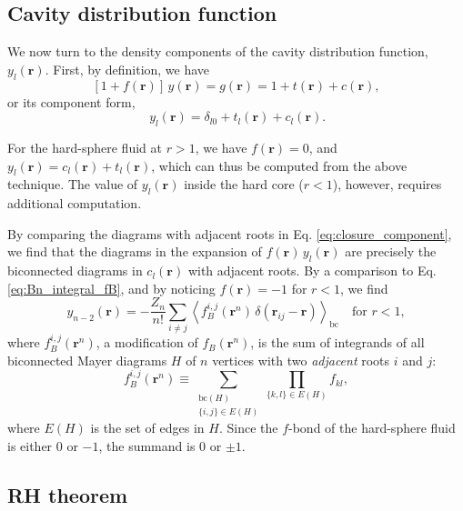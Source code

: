 \documentclass[aip,jcp,preprint,superscriptaddress,showpacs,preprintnumbers,amsmath,amssymb]{revtex4-1}
\numberwithin{equation}{section}
\newcommand{\vct}[1]{\mathbf{#1}}
\providecommand{\vr}{} %
\renewcommand{\vr}{\vct{r}}
\begin{document}
\subsection{Cavity distribution function}





We now turn to the density components of
the cavity distribution function, $y_l(\vr)$.
%
First, by definition, we have
%
%
%
\[
[1 + f(\vr)] \, y(\vr)
= g(\vr)
= 1 + t(\vr) + c(\vr),
\]
%
%
%
or its component form,
%
%
%
\begin{equation}
[1 + f(\vr)] \, y_l(\vr)
= \delta_{l0} + t_l(\vr) + c_l(\vr).
\label{eq:closure_component}
\end{equation}



For the hard-sphere fluid at $r > 1$,
we have $f(\vr) = 0$,
and $y_l(\vr) = c_l(\vr) + t_l(\vr)$,
which can thus be computed from the above technique.
%
The value of $y_l(\vr)$ inside the hard core ($r < 1$),
however, requires additional computation.



By comparing the diagrams with adjacent roots
in Eq. \eqref{eq:closure_component},
we find that the diagrams in the expansion of
$f(\vr) \, y_l(\vr)$ are precisely
the biconnected diagrams in $c_l(\vr)$
with adjacent roots.
%
By a comparison to Eq. \eqref{eq:Bn_integral_fB},
and by noticing $f(\vr) = -1$ for $r < 1$,
we find
%
%
%
\[
y_{n-2}(\vr)
=
-\frac{Z_n}{n!}
\sum_{i \ne j}
\left\langle
  f_B^{i,j}(\vr^n) \, \delta(\vr_{ij} - \vr)
\right\rangle_\mathrm{bc}
\quad
\mbox{for $r < 1$},
\]
%
%
%
where $f_B^{i,j}(\vr^n)$,
a modification of $f_B(\vr^n)$,
is the sum of integrands of all biconnected Mayer diagrams $H$
of $n$ vertices with two \emph{adjacent} roots $i$ and $j$:
%
%
%
\begin{equation}
f_B^{i,j}(\vr^n)
\equiv
\sum_{ \substack{
          \mathrm{bc}(H) \\
          \{i,j\}\in E(H) } }
\prod_{ \{k,l\} \in E(H) }
f_{kl},
\label{eq:fBij_def}
\end{equation}
%
%
%
where $E(H)$ is the set of edges in $H$.
%
Since the $f$-bond of the hard-sphere fluid
is either $0$ or $-1$,
the summand is $0$ or $\pm 1$.





\subsection{RH theorem}
\end{document}
